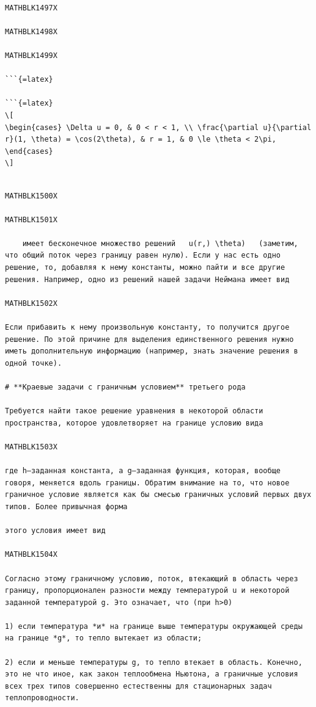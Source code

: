 \documentclass[
]{article}
\begin{document}
\begin{verbatim}

MATHBLK1497X

MATHBLK1498X

MATHBLK1499X

```{=latex}

```{=latex}
\[
\begin{cases} \Delta u = 0, & 0 < r < 1, \\ \frac{\partial u}{\partial r}(1, \theta) = \cos(2\theta), & r = 1, & 0 \le \theta < 2\pi, \end{cases}
\]
\end{verbatim}

\begin{verbatim}

MATHBLK1500X

MATHBLK1501X

    имеет бесконечное множество решений   u(r,) \theta)   (заметим, что общий поток через границу равен нулю). Если у нас есть одно решение, то, добавляя к нему константы, можно пайти и все другие решения. Например, одно из решений нашей задачи Неймана имеет вид

MATHBLK1502X

Если прибавить к нему произвольную константу, то получится другое решение. По этой причине для выделения единственного решения нужно иметь дополнительную информацию (например, знать значение решения в одной точке).

# **Краевые задачи с граничным условием** третьего рода

Требуется найти такое решение уравнения в некоторой области пространства, которое удовлетворяет на границе условию вида

MATHBLK1503X

где h—заданная константа, а g—заданная функция, которая, вообще говоря, меняется вдоль границы. Обратим внимание на то, что новое граничное условие является как бы смесью граничных условий первых двух типов. Более привычная форма

этого условия имеет вид

MATHBLK1504X

Согласно этому граничному условию, поток, втекающий в область через границу, пропорционален разности между температурой u и некоторой заданной температурой g. Это означает, что (при h>0)

1) если температура *и* на границе выше температуры окружающей среды на границе *g*, то тепло вытекает из области;

2) если и меньше температуры g, то тепло втекает в область. Конечно, это не что иное, как закон теплообмена Ньютона, а граничные условия всех трех типов совершенно естественны для стационарных задач теплопроводности.


\end{verbatim}
\end{document}
